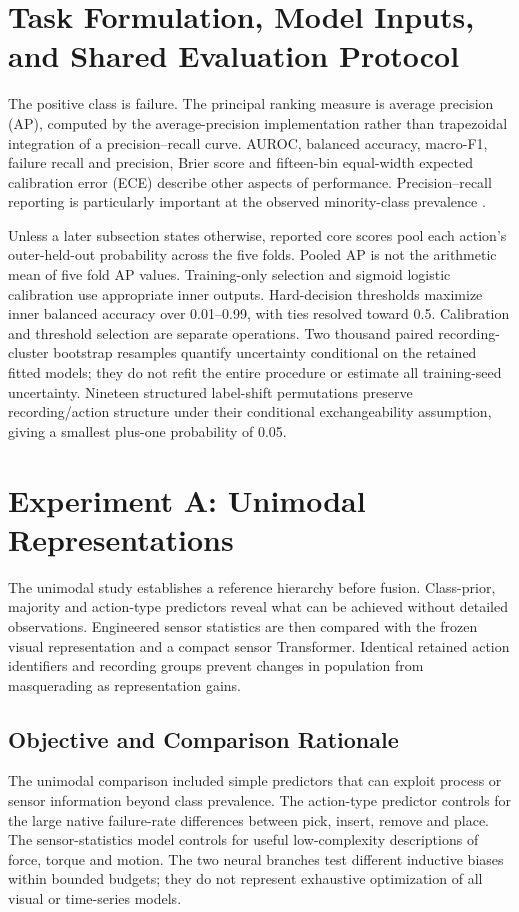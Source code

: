 \section{Task Formulation, Model Inputs, and Shared Evaluation Protocol}
The positive class is failure. The principal ranking measure is average precision (AP), computed by the average-precision implementation rather than trapezoidal integration of a precision--recall curve. AUROC, balanced accuracy, macro-F1, failure recall and precision, Brier score and fifteen-bin equal-width expected calibration error (ECE) describe other aspects of performance. Precision--recall reporting is particularly important at the observed minority-class prevalence \parencite{Saito2015PrecisionRecall}.

Unless a later subsection states otherwise, reported core scores pool each action's outer-held-out probability across the five folds. Pooled AP is not the arithmetic mean of five fold AP values. Training-only selection and sigmoid logistic calibration use appropriate inner outputs. Hard-decision thresholds maximize inner balanced accuracy over 0.01--0.99, with ties resolved toward 0.5. Calibration and threshold selection are separate operations. Two thousand paired recording-cluster bootstrap resamples quantify uncertainty conditional on the retained fitted models; they do not refit the entire procedure or estimate all training-seed uncertainty. Nineteen structured label-shift permutations preserve recording/action structure under their conditional exchangeability assumption, giving a smallest plus-one probability of 0.05.

\section{Experiment A: Unimodal Representations}
The unimodal study establishes a reference hierarchy before fusion. Class-prior, majority and action-type predictors reveal what can be achieved without detailed observations. Engineered sensor statistics are then compared with the frozen visual representation and a compact sensor Transformer. Identical retained action identifiers and recording groups prevent changes in population from masquerading as representation gains.

\subsection{Objective and Comparison Rationale}
The unimodal comparison included simple predictors that can exploit process or sensor information beyond class prevalence. The action-type predictor controls for the large native failure-rate differences between pick, insert, remove and place. The sensor-statistics model controls for useful low-complexity descriptions of force, torque and motion. The two neural branches test different inductive biases within bounded budgets; they do not represent exhaustive optimization of all visual or time-series models.

